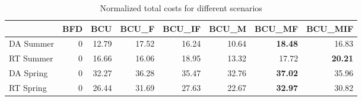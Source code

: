 \begin{table}[ht]
\centering
\begin{tabular}{lrrrrrrr}
\toprule
{} &  BFD &    BCU &  BCU\_F &  BCU\_IF &  BCU\_M &  BCU\_MF &  BCU\_MIF \\
\midrule
DA Summer &    0 &  12.79 &  17.52 &   16.24 &  10.64 &   \textbf{18.48} &    16.83 \\
RT Summer &    0 &  16.66 &  16.06 &   18.95 &  13.32 &   17.72 &    \textbf{20.21} \\
DA Spring &    0 &  32.27 &  36.28 &   35.47 &  32.76 &   \textbf{37.02} &    35.96 \\
RT Spring &    0 &  26.44 &  31.69 &   27.63 &  22.67 &   \textbf{32.97} &    30.82 \\
\bottomrule
\end{tabular}
\caption{Normalized total costs for different scenarios}
\end{table}





